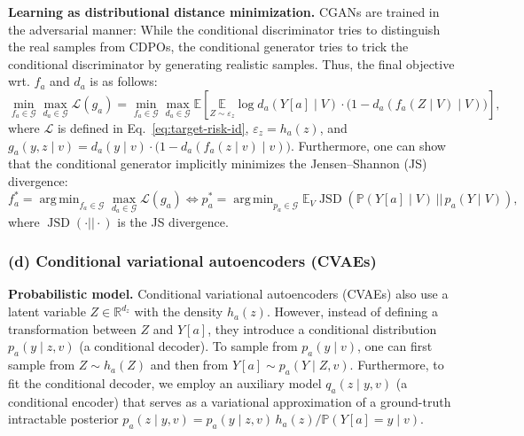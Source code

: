 \documentclass[dvipsnames]{article} %
\DeclareMathOperator*{\argmin}{arg\,min}
\newcommand{\CDPOs}{CDPOs\xspace}
\begin{document}
\textbf{Learning as distributional distance minimization.} CGANs are trained in the adversarial manner: While the conditional discriminator tries to distinguish the real samples from \CDPOs, the conditional generator tries to trick the conditional discriminator by generating realistic samples. Thus, the final objective wrt. $f_a$ and $d_a$ is as follows:
\begin{equation}
    \min_{f_a \in \mathcal{G}} \max_{d_a \in \mathcal{G}} \mathcal{L}(g_a) = \min_{f_a \in \mathcal{G}} \max_{d_a \in \mathcal{G}}  \mathbb{E}\left[\underset{Z \sim \varepsilon_z }{\mathbb{E}} \log d_a(Y[a] \mid V) \cdot \big(1 -d_a(f_a(Z \mid V) \mid V)\big)\right], 
\end{equation}
where $\mathcal{L}$ is defined in Eq.~\eqref{eq:target-risk-id}, $\varepsilon_z = h_a(z)$, and $g_a(y, z \mid v) = d_a(y \mid v) \cdot \big(1 -d_a(f_a(z \mid v) \mid v)\big)$. Furthermore, one can show \citep{goodfellow2014generative} that the conditional generator implicitly minimizes the Jensen–Shannon (JS) divergence:
\begin{equation}
    f_a^* = \argmin_{f_a \in \mathcal{G}} \max_{d_a \in \mathcal{G}} \mathcal{L}(g_a) \Longleftrightarrow p_a^* = \argmin_{p_a \in \mathcal{G}} \mathbb{E}_V \operatorname{JSD}(\mathbb{P}(Y[a] \mid V)\,|| \, p_a(Y \mid V )),
\end{equation}
where $\operatorname{JSD} (\cdot || \cdot )$ is the JS divergence.

\subsubsection{(d) Conditional variational autoencoders (CVAEs)}

\textbf{Probabilistic model.} Conditional variational autoencoders (CVAEs) \citep{kingma2014auto,oh2022cvae} also use a latent variable $Z \in \mathbb{R}^{d_z}$ with the density $h_a(z)$. However, instead of defining a transformation between $Z$ and $Y[a]$, they introduce a conditional distribution $p_a(y \mid z, v)$ (a conditional decoder). To sample from $p_a(y \mid v)$, one can first sample from $Z \sim h_a(Z)$ and then from $Y[a] \sim p_a(Y \mid Z, v)$. Furthermore, to fit the conditional decoder, we employ an auxiliary model $q_a(z \mid y, v)$ (a conditional encoder) that serves as a variational approximation of a ground-truth intractable posterior $p_a(z \mid y, v) = p_a(y\mid z, v) \, h_a(z) / \mathbb{P}(Y[a] = y \mid v)$. 
\end{document}
